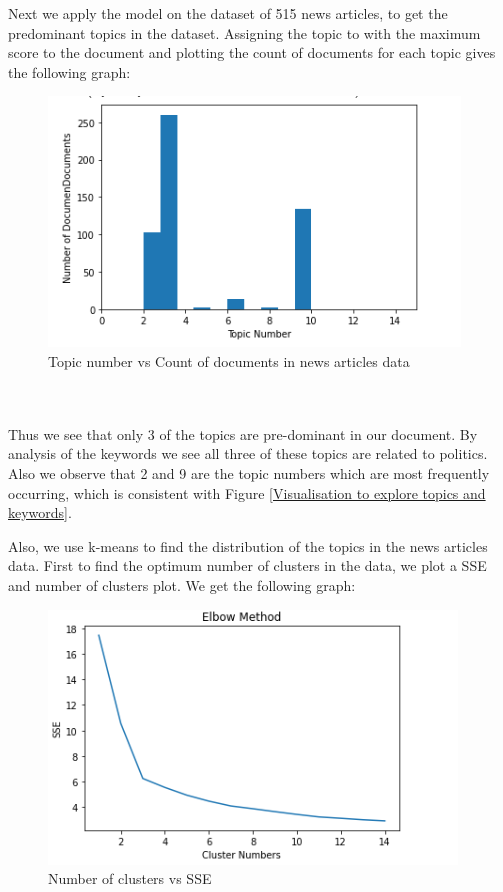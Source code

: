 \documentclass{article}
\begin{document}
Next we apply the model on the dataset of 515 news articles, to get the predominant topics in the dataset. Assigning the topic to with the maximum score to the document and plotting the count of documents for each topic gives the following graph:

\begin{figure}[H]
    \centering
    \includegraphics[scale=1]{dist.PNG}
    \caption{Topic number vs Count of documents in news articles data}
    \label{Topic number vs Count of documents in news articles data}
\end{figure}
\\ 

\\Thus we see that only 3 of the topics are pre-dominant in our document. By analysis of the keywords we see all three of these topics are related to politics. Also we observe that 2 and 9 are the topic numbers which are most  frequently occurring, which is consistent with Figure \ref{Visualisation to explore topics and keywords}. 

Also, we use k-means to find the distribution of the topics in the news articles data. First to find the optimum number of clusters in the data, we plot a SSE and number of clusters plot. We get the following graph:
\begin{figure}[H]
    \centering
    \includegraphics{sse.PNG}
    \caption{Number of clusters vs SSE}
    \label{Number of clusters vs SSE}
\end{figure}
\end{document}
